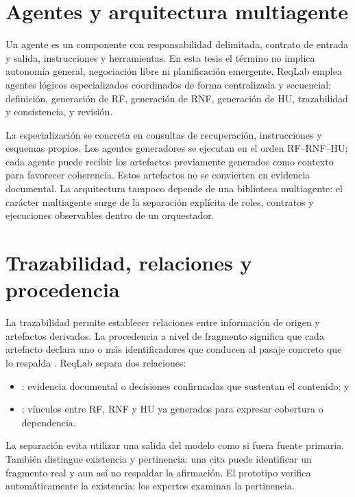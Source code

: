 \section{Agentes y arquitectura multiagente}

Un agente es un componente con responsabilidad delimitada, contrato de entrada y salida, instrucciones y herramientas. En esta tesis el término no implica autonomía general, negociación libre ni planificación emergente. ReqLab emplea agentes lógicos especializados coordinados de forma centralizada y secuencial: definición, generación de RF, generación de RNF, generación de HU, trazabilidad y consistencia, y revisión.

La especialización se concreta en consultas de recuperación, instrucciones y esquemas propios. Los agentes generadores se ejecutan en el orden RF--RNF--HU; cada agente puede recibir los artefactos previamente generados como contexto para favorecer coherencia. Estos artefactos no se convierten en evidencia documental. La arquitectura tampoco depende de una biblioteca multiagente: el carácter multiagente surge de la separación explícita de roles, contratos y ejecuciones observables dentro de un orquestador.

\section{Trazabilidad, relaciones y procedencia}

La trazabilidad permite establecer relaciones entre información de origen y artefactos derivados. La procedencia a nivel de fragmento significa que cada artefacto declara uno o más identificadores que conducen al pasaje concreto que lo respalda \cite{mucha2024,guo2025}. ReqLab separa dos relaciones:

\begin{itemize}
  \item {}: evidencia documental o decisiones confirmadas que sustentan el contenido; y
  \item {}: vínculos entre RF, RNF y HU ya generados para expresar cobertura o dependencia.
\end{itemize}

La separación evita utilizar una salida del modelo como si fuera fuente primaria. También distingue existencia y pertinencia: una cita puede identificar un fragmento real y aun así no respaldar la afirmación. El prototipo verifica automáticamente la existencia; los expertos examinan la pertinencia.

